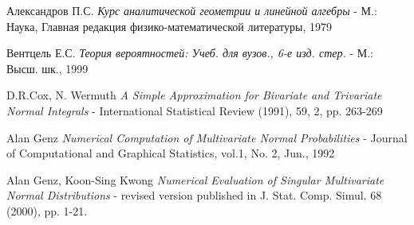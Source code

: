 \begin{thebibliography}{2}
\item
Александров П.С. \emph{Курс аналитической геометрии и линейной алгебры} - М.: Наука, Главная редакция физико-математической литературы, 1979
\item
Вентцель Е.С. \emph{Теория вероятностей: Учеб. для вузов., 6-е изд. стер.} - М.: Высш. шк., 1999
\item
D.R.Cox, N. Wermuth \emph{A Simple Approximation for Bivariate and Trivariate Normal Integrals} - International Statistical Review (1991), 59, 2, pp. 263-269
\item
Alan Genz \emph{Numerical Computation of Multivariate Normal Probabilities} - Journal of Computational and Graphical Statistics, vol.1, No. 2, Jun., 1992
\item
Alan Genz, Koon-Sing Kwong \emph{Numerical Evaluation of Singular Multivariate Normal Distributions} - revised version published in J. Stat. Comp. Simul. 68 (2000), pp. 1-21. 
\end{thebibliography}